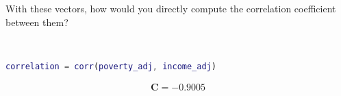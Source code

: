 With these vectors, how would you directly compute the correlation coefficient between them?

\begin{solution} \
    \begin{lstlisting}[language=Matlab]
correlation = corr(poverty_adj, income_adj)
    \end{lstlisting}
    
    \begin{align*}
        \boldsymbol{C} = -0.9005
    \end{align*}
\end{solution}
